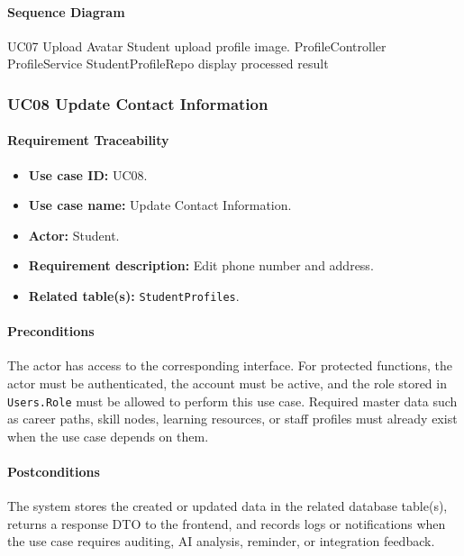 \paragraph{Sequence Diagram}

\SequenceDiagram
{UC07 Upload Avatar}
{Student}
{upload profile image.}
{ProfileController}
{ProfileService}
{StudentProfileRepo}
{display processed result}

\subsubsection{UC08 Update Contact Information}

\paragraph{Requirement Traceability}

\begin{itemize}
    \item \textbf{Use case ID:} UC08.
    \item \textbf{Use case name:} Update Contact Information.
    \item \textbf{Actor:} Student.
    \item \textbf{Requirement description:} Edit phone number and address.
    \item \textbf{Related table(s):} \texttt{StudentProfiles}.
\end{itemize}

\paragraph{Preconditions}

The actor has access to the corresponding interface. For protected functions, the actor must be authenticated, the account must be active, and the role stored in \texttt{Users.Role} must be allowed to perform this use case. Required master data such as career paths, skill nodes, learning resources, or staff profiles must already exist when the use case depends on them.

\paragraph{Postconditions}

The system stores the created or updated data in the related database table(s), returns a response DTO to the frontend, and records logs or notifications when the use case requires auditing, AI analysis, reminder, or integration feedback.


